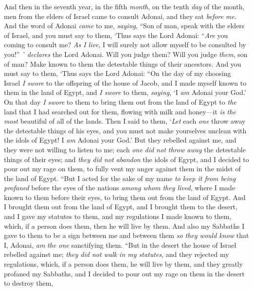 \begin{biblechapter} %
 And then in the seventh year, in the fifth \textit{month}, on the tenth \textit{day} of the month, men from the elders of Israel came to consult Adonai, and they sat \textit{before me}.
\verse And the word of Adonai \textit{came} to me, \textit{saying},
\verse “Son of man, speak with the elders of Israel, and you must say to them, ‘Thus says the Lord Adonai: “\textit{Are} you coming to consult me? \textit{As I live}, I will surely not allow myself to be consulted by you!” ’ \textit{declares} the Lord Adonai.
\verse Will you judge them? Will you judge \textit{them}, son of man? Make known to them the detestable things of their ancestors.
\verse And you must say to them, ‘Thus says the Lord Adonai: “On the day of my choosing Israel \textit{I swore} to the offspring of the house of Jacob, and I made myself known to them in the land of Egypt, and \textit{I swore} to them, \textit{saying}, ‘I \textit{am} Adonai your God.’
\verse On that day \textit{I swore} to them to bring them out from the land of Egypt to \textit{the} land that I had searched out for them, flowing with milk and honey—it \textit{is the most} beautiful of all of the lands.
\verse Then I said to them, ‘\textit{Let} each \textit{one} throw away the detestable things of his eyes, and you must not make yourselves unclean with the idols of Egypt! I \textit{am} Adonai your God.’
\verse But they rebelled against me, and they were not willing to listen to me; each \textit{one} \textit{did not throw away} the detestable things of their eyes; and \textit{they did not abandon} the idols of Egypt, and I decided to pour out my rage on them, to fully vent my anger against them in the midst of the land of Egypt.
\verse “But I acted for the sake of my name \textit{to keep it from being profaned} before the eyes of the nations \textit{among whom they lived}, where I made known to them before their eyes, to bring them out from the land of Egypt.
\verse And I brought them out from the land of Egypt, and I brought them to the desert,
\verse and I gave my statutes to them, and my regulations I made known to them, which, if a person does them, then he will live by them.
\verse And also my Sabbaths I gave to them to be a sign between me and between them \textit{so they would know} that I, Adonai, \textit{am} \textit{the one} sanctifying them.
\verse “But in the desert the house of Israel rebelled against me; \textit{they did not walk in my statutes}, and they rejected my regulations, which, if a person does them, he will live by them, and they greatly profaned my Sabbaths, and I decided to pour out my rage on them in the desert to destroy them,

\end{biblechapter}
